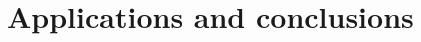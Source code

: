\documentclass[11pt]{article}
\begin{document}
% 
% 
% 

\FloatBarrier
\section{Applications and conclusions}
\label{appcon}

\FloatBarrier


\end{document}
